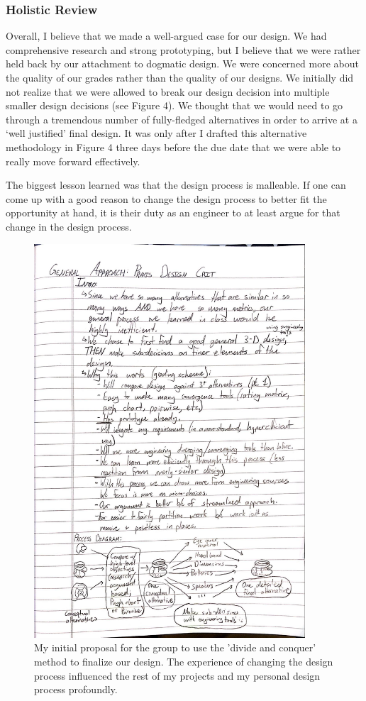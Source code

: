 \documentclass[a4paper,12pt]{article}
\begin{document}
\subsubsection{Holistic Review}
Overall, I believe that we made a well-argued case for our design. We had comprehensive research and strong prototyping, but I believe that we were rather held back by our attachment to dogmatic design. We were concerned more about the quality of our grades rather than the quality of our designs. We initially did not realize that we were allowed to break our design decision into multiple smaller design decisions (see Figure 4). We thought that we would need to go through a tremendous number of fully-fledged alternatives in order to arrive at a ‘well justified’ final design. It was only after I drafted this alternative methodology in Figure 4 three days before the due date that we were able to really move forward effectively.

The biggest lesson learned was that the design process is malleable. If one can come up with a good reason to change the design process to better fit the opportunity at hand, it is their duty as an engineer to at least argue for that change in the design process.

\begin{figure}[H]
\centering
\includegraphics[width=0.9\textwidth]{img/image004.jpg}
\caption{My initial proposal for the group to use the 'divide and conquer' method to finalize our design. The experience of changing the design process influenced the rest of my projects and my personal design process profoundly.}
\label{}
\end{figure}
\end{document}
